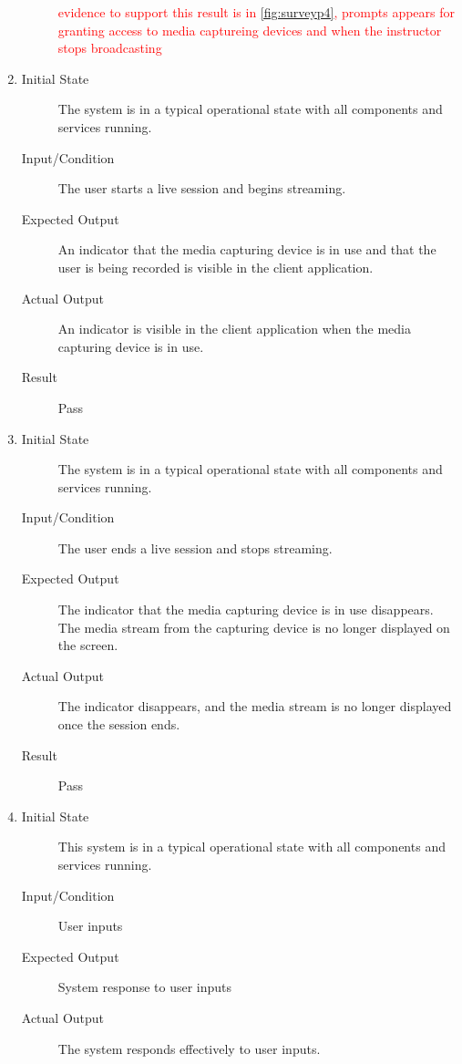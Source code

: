 \documentclass[12pt, titlepage]{article}
\newcommand{\rt}[1]{\textcolor{red}{#1}}
\begin{document}
\begin{enumerate}[NFR-T1]
\begin{description}
    \rt{ evidence to support this result is in \ref{fig:surveyp4}, prompts appears for granting access to media captureing devices and when the instructor stops broadcasting}
    \end{description}
  \item \label{NFRT25}
    \begin{description}
    \item[Initial State] The system is in a typical operational state with all
      components and services running.
    \item[Input/Condition] The user starts a live session and begins streaming.
    \item[Expected Output] An indicator that the media capturing device is in use
      and that the user is being recorded is visible in the client application.
    \item[Actual Output] An indicator is visible in the client application when the
      media capturing device is in use.
    \item[Result] Pass
    \end{description}
  \item \label{NFRT26}
    \begin{description}
    \item[Initial State] The system is in a typical operational state with all
      components and services running.
    \item[Input/Condition] The user ends a live session and stops streaming.
    \item[Expected Output] The indicator that the media capturing device is in use
      disappears. The media stream from the capturing device is no longer
      displayed on the screen.
    \item[Actual Output] The indicator disappears, and the media stream is no
      longer displayed once the session ends.
    \item[Result] Pass
    \end{description}
  \item \label{NFRT27}
    \begin{description}
    \item[Initial State] This system is in a typical operational state with all
      components and services running.
    \item[Input/Condition] User inputs
    \item[Expected Output] System response to user inputs
    \item[Actual Output] The system responds effectively to user inputs.

\end{description}
\end{enumerate}
\end{document}
